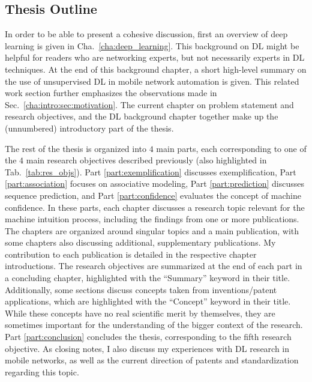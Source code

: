 		\subsection{Thesis Outline}
		
			In order to be able to present a cohesive discussion, first an overview of deep learning is given in Cha.~\ref{cha:deep_learning}.
		 	This background on \ac{DL} might be helpful for readers who are networking experts, but not necessarily experts in \ac{DL} techniques.
			At the end of this background chapter, a short high-level summary on the use of unsupervised \ac{DL} in mobile network automation is given.
		 	This related work section further emphasizes the observations made in Sec.~\ref{cha:intro:sec:motivation}.
		 	The current chapter on problem statement and research objectives, and the \ac{DL} background chapter together make up the (unnumbered) introductory part of the thesis.
		 	
			The rest of the thesis is organized into $4$ main parts, each corresponding to one of the $4$ main research objectives described previously (also highlighted in Tab.~\ref{tab:res_objs}).			
			Part \ref{part:exemplification} discusses exemplification, Part \ref{part:association} focuses on associative modeling, Part \ref{part:prediction} discusses sequence prediction, and Part \ref{part:confidence} evaluates the concept of machine confidence.			
			In these parts, each chapter discusses a research topic relevant for the machine intuition process, including the findings from one or more publications.
			The chapters are organized around singular topics and a main publication, with some chapters also discussing additional, supplementary publications.
			My contribution to each publication is detailed in the respective chapter introductions.
			The research objectives are summarized at the end of each part in a concluding chapter, highlighted with the ``Summary'' keyword in their title.
			Additionally, some sections discuss concepts taken from inventions/patent applications, which are highlighted with the ``Concept'' keyword in their title.
			While these concepts have no real scientific merit by themselves, they are sometimes important for the understanding of the bigger context of the research.					
			Part \ref{part:conclusion} concludes the thesis, corresponding to the fifth research objective.
			As closing notes, I also discuss my experiences with \ac{DL} research in mobile networks, as well as the current direction of patents and standardization regarding this topic.			
			
